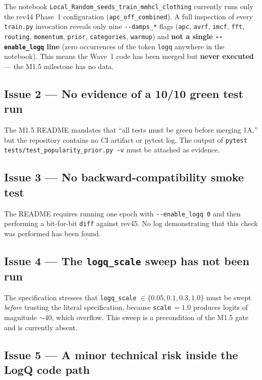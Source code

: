 \documentclass[11pt, a4paper]{article}
\begin{document}
The notebook \texttt{Local\_Random\_seeds\_train\_mmhcl\_clothing} currently runs
only the rev44 Phase~1 configuration (\texttt{apc\_off\_combined}). A full inspection
of every \texttt{train.py} invocation reveals only nine \texttt{-{}-damps\_*} flags
(\texttt{apc}, \texttt{avrf}, \texttt{imcf}, \texttt{fft}, \texttt{routing},
\texttt{momentum}, \texttt{prior}, \texttt{categories}, \texttt{warmup}) and
\textbf{not a single \texttt{-{}-enable\_logq} line} (zero occurrences of the token
\texttt{logq} anywhere in the notebook). This means the Wave~1 code has been merged
but \textbf{never executed} --- the M1.5 milestone has no data.

\subsection{Issue 2 --- No evidence of a 10/10 green test run}

The M1.5 README mandates that ``all tests must be green before merging 1A,'' but the
repository contains no CI artifact or pytest log. The output of
\texttt{pytest tests/test\_popularity\_prior.py -v} must be attached as evidence.

\subsection{Issue 3 --- No backward-compatibility smoke test}

The README requires running one epoch with \texttt{-{}-enable\_logq 0} and then
performing a bit-for-bit \texttt{diff} against rev45. No log demonstrating that this
check was performed has been found.

\subsection{Issue 4 --- The \texttt{logq\_scale} sweep has not been run}

The specification stresses that \texttt{logq\_scale} $\in \{0.05, 0.1, 0.3, 1.0\}$
must be swept \emph{before} trusting the literal specification, because
\texttt{scale}\,$=1.0$ produces logits of magnitude $\sim 40$, which overflow.
This sweep is a precondition of the M1.5 gate and is currently absent.

\subsection{Issue 5 --- A minor technical risk inside the LogQ code path}
\end{document}
